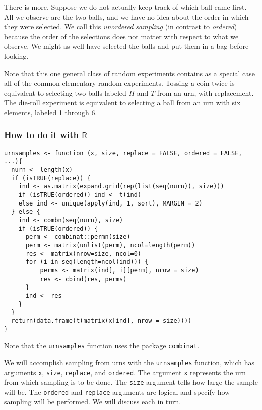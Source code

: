 There is more. Suppose we do not actually keep track of which ball
came first. All we observe are the two balls, and we have no idea
about the order in which they were selected. We call this \emph{unordered
sampling} (in contrast to \emph{ordered}) because the order of the
selections does not matter with respect to what we observe. We might
as well have selected the balls and put them in a bag before looking.

Note that this one general class of random experiments contains as a
special case all of the common elementary random experiments. Tossing
a coin twice is equivalent to selecting two balls labeled \(H\) and
\(T\) from an urn, with replacement. The die-roll experiment is
equivalent to selecting a ball from an urn with six elements, labeled
1 through 6.

\subsubsection{How to do it with \(\mathsf{R}\)}
\label{sec-4-1-2-1}

\begin{Verbatim}
urnsamples <- function (x, size, replace = FALSE, ordered = FALSE, ...){
  nurn <- length(x)
  if (isTRUE(replace)) {
    ind <- as.matrix(expand.grid(rep(list(seq(nurn)), size)))
    if (isTRUE(ordered)) ind <- t(ind)
    else ind <- unique(apply(ind, 1, sort), MARGIN = 2)
  } else {
    ind <- combn(seq(nurn), size)
    if (isTRUE(ordered)) {
      perm <- combinat::permn(size)
      perm <- matrix(unlist(perm), ncol=length(perm))
      res <- matrix(nrow=size, ncol=0)
      for (i in seq(length=ncol(ind))) {
          perms <- matrix(ind[, i][perm], nrow = size)
          res <- cbind(res, perms)
      }
      ind <- res
    }
  }
  return(data.frame(t(matrix(x[ind], nrow = size))))
}
\end{Verbatim}

Note that the \texttt{urnsamples} function uses the package \texttt{combinat}.

We will accomplish sampling from urns with
the \texttt{urnsamples} 
function, which has arguments \texttt{x}, \texttt{size}, \texttt{replace}, and
\texttt{ordered}. The argument \texttt{x} represents the urn from which sampling is
to be done. The \texttt{size} argument tells how large the sample will
be. The \texttt{ordered} and \texttt{replace} arguments are logical and specify how
sampling will be performed. We will discuss each in turn.

